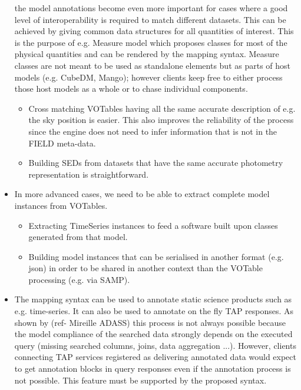 \begin{itemize}
  the model annotations become even more important for cases where a good level of interoperability is required to match different datasets. %
           This can be achieved by giving  common data structures for all quantities of interest. This is the purpose of e.g. Measure model which proposes classes for 
           most of the physical quantities and can be rendered by the mapping syntax. Measure classes are not meant to be used as standalone elements but as parts of host models (e.g. CubeDM, Mango);
           however clients keep free to either process those host models as a whole or to chase individual components.
    \begin{itemize}
      \item Cross matching VOTables having all the same accurate description of e.g. the sky position is easier. %
               This also improves the reliability of the process since the engine does not need to infer information that is not in the FIELD meta-data.
      \item Building SEDs from datasets that have the same accurate photometry representation is straightforward.
   \end{itemize}          

  \item In more advanced cases, we need to be able to extract complete model instances from VOTables.
    \begin{itemize}
      \item Extracting  TimeSeries instances to feed a software built upon classes generated from that model.
      \item Building model instances that can be serialised in another format (e.g. json) in order to be shared in another context than the VOTable processing (e.g. via SAMP).
   \end{itemize}         
    
   \item The mapping syntax can be used to annotate static science products such as e.g. time-series. It can also be used to annotate on the fly TAP responses.
   As shown by (ref- Mireille ADASS) this process is not always possible because the model compliance of the searched data strongly depends on the executed query (missing searched columns, joins, data aggregation ...). 
   However, clients connecting TAP services registered as delivering annotated data would expect to get annotation blocks in query responses even if the annotation process is not possible. 
   This feature must be supported by the proposed syntax.
    
\end{itemize} 

